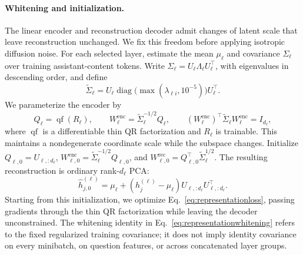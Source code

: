 \documentclass{article}
\begin{document}
\paragraph{Whitening and initialization.}
The linear encoder and reconstruction decoder admit changes of latent scale that leave reconstruction unchanged. We fix this freedom before applying isotropic diffusion noise. For each selected layer, estimate the mean $\mu_\ell$ and covariance $\Sigma_\ell$ over training assistant-content tokens. Write $\Sigma_\ell=U_\ell\Lambda_\ell U_\ell^\top$, with eigenvalues in descending order, and define
\[
 \widetilde\Sigma_\ell=U_\ell\operatorname{diag}\!\big(\max(\lambda_{\ell i},10^{-5})\big)U_\ell^\top.
\]
We parameterize the encoder by
\begin{equation}
 Q_\ell=\operatorname{qf}(R_\ell),\qquad
 W_\ell^{\mathrm{enc}}=\widetilde\Sigma_\ell^{-1/2}Q_\ell,\qquad
 (W_\ell^{\mathrm{enc}})^\top\widetilde\Sigma_\ell W_\ell^{\mathrm{enc}}=I_{d_\ell},
 \label{eq:representationwhitening}
\end{equation}
where $\operatorname{qf}$ is a differentiable thin QR factorization and $R_\ell$ is trainable. This maintains a nondegenerate coordinate scale while the subspace changes.
Initialize $Q_{\ell,0}=U_{\ell,:d_\ell}$, $W_{\ell,0}^{\mathrm{enc}}=\widetilde\Sigma_\ell^{-1/2}Q_{\ell,0}$, and $W_{\ell,0}^{\mathrm{rec}}=Q_{\ell,0}^\top\widetilde\Sigma_\ell^{1/2}$. The resulting reconstruction is ordinary rank-$d_\ell$ PCA:
\[
 \widehat h_{j,0}^{(\ell)}=\mu_\ell+(h_j^{(\ell)}-\mu_\ell)U_{\ell,:d_\ell}U_{\ell,:d_\ell}^\top.
\]
Starting from this initialization, we optimize Eq.~\eqref{eq:representationloss}, passing gradients through the thin QR factorization while leaving the decoder unconstrained. The whitening identity in Eq.~\eqref{eq:representationwhitening} refers to the fixed regularized training covariance; it does not imply identity covariance on every minibatch, on question features, or across concatenated layer groups.
\end{document}
